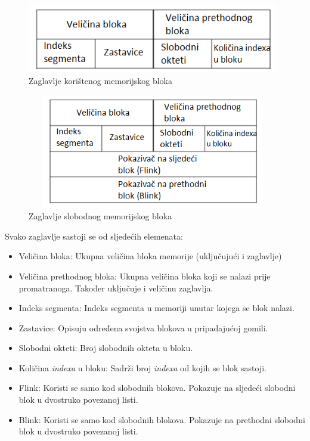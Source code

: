 \documentclass[times, utf8, diplomski, numeric]{fer}
\begin{document}
\begin{figure}[!ht]
\centering
\setlength\fboxsep{0pt}
\setlength\fboxrule{0.5pt}
\includegraphics[width=11cm, height=3cm]{slike/used_heap_block}
\caption{Zaglavlje korištenog memorijskog bloka}
\label{fig:used_heap_block} 
\end{figure}

\begin{figure}[!ht]
\centering
\setlength\fboxsep{0pt}
\setlength\fboxrule{0.5pt}
\includegraphics[width=11cm, height=5cm]{slike/free_heap_block}
\caption{Zaglavlje slobodnog memorijskog bloka}
\label{fig:free_heap_block} 
\end{figure}
\pagebreak
Svako zaglavlje sastoji se od sljedećih elemenata:
\begin{itemize}
\item Veličina bloka: Ukupna veličina bloka memorije (uključujući i zaglavlje)
\item Veličina prethodnog bloka: Ukupna veličina bloka koji se nalazi prije promatranoga. Također uključuje i veličinu zaglavlja.
\item Indeks segmenta: Indeks segmenta u memoriji unutar kojega se blok nalazi.
\item Zastavice: Opisuju određena svojstva blokova u pripadajućoj gomili.
\item Slobodni okteti: Broj slobodnih okteta u bloku.
\item Količina \emph{indexa} u bloku: Sadrži broj \emph{indexa} od kojih se blok sastoji. 
\item Flink: Koristi se samo kod slobodnih blokova. Pokazuje na sljedeći slobodni blok u dvostruko povezanoj listi.
\item Blink: Koristi se samo kod slobodnih blokova. Pokazuje na prethodni slobodni blok u dvostruko povezanoj listi.
\end{itemize}
\end{document}
